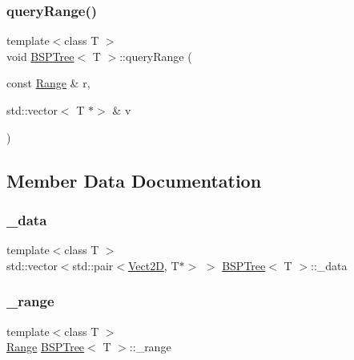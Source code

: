\mbox{\label{classBSPTree_a05d3d440bd02e164f450ef26fd94a2d9_a05d3d440bd02e164f450ef26fd94a2d9}} 
\subsubsection{\texorpdfstring{query\+Range()}{queryRange()}}
{\footnotesize\ttfamily template$<$class T $>$ \\
void \hyperlink{classBSPTree}{B\+S\+P\+Tree}$<$ T $>$\+::query\+Range (\begin{DoxyParamCaption}\item[{const \hyperlink{classRange}{Range} \&}]{r,  }\item[{std\+::vector$<$ T $\ast$$>$ \&}]{v }\end{DoxyParamCaption})\hspace{0.3cm}{\ttfamily [inline]}}



\subsection{Member Data Documentation}
\mbox{\label{classBSPTree_af60e625922e4eeb8647f5cd07d28dddd_af60e625922e4eeb8647f5cd07d28dddd}} 
\subsubsection{\texorpdfstring{\+\_\+data}{\_data}}
{\footnotesize\ttfamily template$<$class T $>$ \\
std\+::vector$<$std\+::pair$<$\hyperlink{classVect2D}{Vect2D}, T$\ast$$>$ $>$ \hyperlink{classBSPTree}{B\+S\+P\+Tree}$<$ T $>$\+::\+\_\+data\hspace{0.3cm}{\ttfamily [private]}}

\mbox{\label{classBSPTree_a9af2e4216eb728b7135b197b0e1c4dea_a9af2e4216eb728b7135b197b0e1c4dea}} 
\subsubsection{\texorpdfstring{\+\_\+range}{\_range}}
{\footnotesize\ttfamily template$<$class T $>$ \\
\hyperlink{classRange}{Range} \hyperlink{classBSPTree}{B\+S\+P\+Tree}$<$ T $>$\+::\+\_\+range\hspace{0.3cm}{\ttfamily [private]}}

